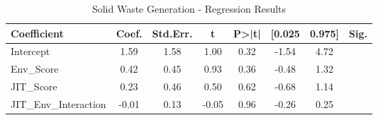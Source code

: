 \begin{table}[htbp]
    \centering
    \caption{Solid Waste Generation - Regression Results}
    \label{tab:regression}
    \begin{tabular}{lccccccc}
\toprule
Coefficient & Coef. & Std.Err. & t & P>|t| & [0.025 & 0.975] & Sig. \\
\midrule
Intercept & 1.59 & 1.58 & 1.00 & 0.32 & -1.54 & 4.72 &  \\
Env\_Score & 0.42 & 0.45 & 0.93 & 0.36 & -0.48 & 1.32 &  \\
JIT\_Score & 0.23 & 0.46 & 0.50 & 0.62 & -0.68 & 1.14 &  \\
JIT\_Env\_Interaction & -0.01 & 0.13 & -0.05 & 0.96 & -0.26 & 0.25 &  \\
\bottomrule
\end{tabular}

    \end{table}
    